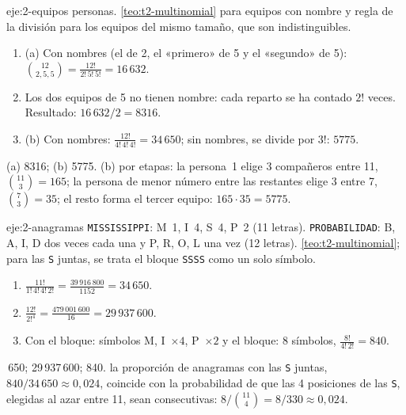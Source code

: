 \begin{solucion}{eje:2-equipos}
 personas.
\planteamiento \cref{teo:t2-multinomial} para equipos con nombre y regla de la división para los equipos del mismo tamaño, que son indistinguibles.
\pasos
\begin{enumerate}[label=\arabic*.]
  \item (a) Con nombres (el de 2, el «primero» de 5 y el «segundo» de 5): $\binom{12}{2,5,5}=\frac{12!}{2!\,5!\,5!}=16\,632$.
  \item Los dos equipos de 5 no tienen nombre: cada reparto se ha contado $2!$ veces. Resultado: $16\,632/2=8316$.
  \item (b) Con nombres: $\frac{12!}{4!\,4!\,4!}=34\,650$; sin nombres, se divide por $3!$: $5775$.
\end{enumerate}
\resultado (a) 8316; (b) 5775.
\comprobacion (b) por etapas: la persona~1 elige 3 compañeros entre 11, $\binom{11}{3}=165$; la persona de menor número entre las restantes elige 3 entre 7, $\binom73=35$; el resto forma el tercer equipo: $165\cdot35=5775$.
\end{solucion}

\begin{solucion}{eje:2-anagramas}
\datos \texttt{MISSISSIPPI}: M~1, I~4, S~4, P~2 (11 letras). \texttt{PROBABILIDAD}: B, A, I, D dos veces cada una y P, R, O, L una vez (12 letras).
\planteamiento \cref{teo:t2-multinomial}; para las \texttt{S} juntas, se trata el bloque \texttt{SSSS} como un solo símbolo.
\pasos
\begin{enumerate}[label=\arabic*.]
  \item $\frac{11!}{1!\,4!\,4!\,2!}=\frac{39\,916\,800}{1152}=34\,650$.
  \item $\frac{12!}{2!^{4}}=\frac{479\,001\,600}{16}=29\,937\,600$.
  \item Con el bloque: símbolos M, I~$\times4$, P~$\times2$ y el bloque: 8 símbolos, $\frac{8!}{4!\,2!}=840$.
\end{enumerate}
\,650; 29\,937\,600; 840.
\comprobacion la proporción de anagramas con las \texttt{S} juntas, $840/34\,650\approx0{,}024$, coincide con la probabilidad de que las 4 posiciones de las \texttt{S}, elegidas al azar entre 11, sean consecutivas: $8/\binom{11}{4}=8/330\approx0{,}024$.
\end{solucion}

